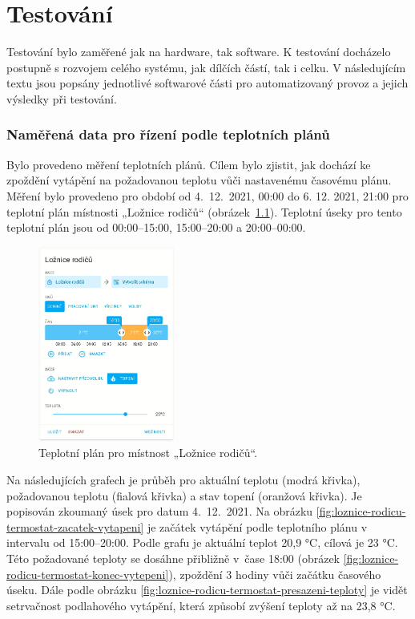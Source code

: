 \chapter{Testování}

Testování bylo zaměřené jak na hardware, tak software. K testování docházelo postupně s rozvojem celého systému, jak dílčích částí, tak i celku. V následujícím textu jsou popsány jednotlivé softwarové části pro automatizovaný provoz a jejich výsledky při testování.

\subsection{Naměřená data pro řízení podle teplotních plánů}

Bylo provedeno měření teplotních plánů. Cílem bylo zjistit, jak dochází ke zpoždění vytápění na požadovanou teplotu vůči nastavenému časovému plánu. Měření bylo provedeno pro období od 4.~12.~2021, 00:00 do 6. 12. 2021, 21:00 pro teplotní plán místnosti „Ložnice rodičů“ (obrázek~\ref{fig:teplotni-plan-loznice-rodicu}). Teplotní úseky pro tento teplotní plán jsou od 00:00–15:00, 15:00–20:00 a 20:00–00:00.

\begin{figure}[H]
    \centering
    \includegraphics[width=0.4\textwidth]{images/testovani/teplotni-plany/teplotni-plan-loznice-rodicu.png}
    \caption{Teplotní plán pro místnost „Ložnice rodičů“.}
    \label{fig:teplotni-plan-loznice-rodicu}
\end{figure}

Na následujících grafech je průběh pro aktuální teplotu (modrá křivka), požadovanou teplotu (fialová křivka) a stav topení (oranžová křivka). Je popisován zkoumaný úsek pro datum 4.~12.~2021. Na obrázku \ref{fig:loznice-rodicu-termostat-zacatek-vytapeni} je začátek vytápění podle teplotního plánu v intervalu od 15:00–20:00. Podle grafu je aktuální teplot 20,9 °C, cílová je 23 °C. Této požadované teploty se dosáhne přibližně v~čase 18:00 (obrázek \ref{fig:loznice-rodicu-termostat-konec-vytepeni}), zpoždění 3 hodiny vůči začátku časového úseku. Dále podle obrázku \ref{fig:loznice-rodicu-termostat-presazeni-teploty} je vidět setrvačnost podlahového vytápění, která způsobí zvýšení teploty až na 23,8 °C.

